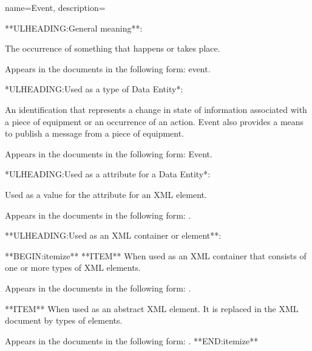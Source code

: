 {
    name={Event},
	description={
	**ULHEADING:General meaning**:

	The occurrence of something that happens or takes place.

	Appears in the documents in the following form: event.

	*ULHEADING:Used as a type of \gls{Data Entity}*:

	An identification that represents a change in state of information associated with a piece of equipment or an occurrence of an action.  Event also provides a means to publish a message from a piece of equipment.

	Appears in the documents in the following form: \gls{Event}.

	*ULHEADING:Used as a  attribute for a \gls{Data Entity}*:

	Used as a value for the  attribute for an XML  element.

	Appears in the documents in the following form: .

	**ULHEADING:Used as an XML container or element**:

    **BEGIN:itemize**
	**ITEM** When used as an XML container that consists of one or more types of  XML elements.

	Appears in the documents in the following form: .

	**ITEM** When used as an abstract XML element.  It is replaced in the XML document by types of  elements.

	Appears in the documents in the following form: .
    **END:itemize**
}
}

